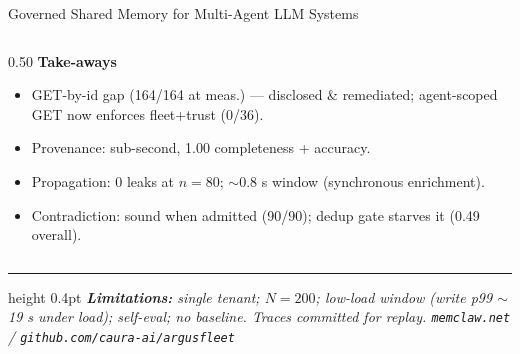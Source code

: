 \documentclass[10pt,aspectratio=169]{beamer}
\begin{document}
\begin{frame}[shrink]{Governed Shared Memory for Multi-Agent LLM Systems}
\begin{columns}[T,onlytextwidth]
\begin{column}{0.50\textwidth}
\textbf{Take-aways}
\begin{itemize}\setlength\itemsep{0.05em}\setlength\parskip{0pt}\setlength\leftmargin{1em}
  \item GET-by-id gap (164/164 at meas.) ---
        \textcolor{good}{disclosed \& remediated}; agent-scoped GET now
        enforces fleet+trust (0/36).
  \item Provenance: \textcolor{good}{sub-second}, \textcolor{good}{1.00 completeness + accuracy}.
  \item Propagation: \textcolor{good}{0 leaks at $n=80$};
        \textcolor{good}{$\sim$0.8 s window} (synchronous enrichment).
  \item Contradiction: \textcolor{good}{sound when admitted (90/90)};
        \textcolor{warn}{dedup gate starves it} (0.49 overall).
\end{itemize}

\end{column}

\end{columns}

\vspace{0.2em}
\hrule height 0.4pt
\vspace{0.15em}
{\scriptsize\itshape
\textbf{Limitations:} single tenant; $N=200$; low-load window (write p99
$\sim$19 s under load); self-eval; no baseline. Traces committed for replay. \hfill
\texttt{memclaw.net} / \texttt{github.com/caura-ai/argusfleet}}

\end{frame}
\end{document}

